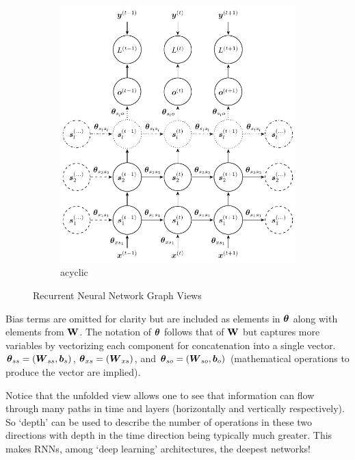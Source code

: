 \begin{figure}[H]
\begin{subfigure}[]{.79\textwidth}
    \begin{center}
    \includegraphics[]{figs/rnn_uf.pdf}
    \end{center}
    \caption{acyclic}
    \label{fig:rnn_uf}
  \end{subfigure}
  \caption{Recurrent Neural Network Graph Views}
  \label{fig:rnn}
\end{figure}
\noindent
%
Bias terms are omitted for clarity but are included as elements in $\boldsymbol{\theta}$ along with elements from $\mathbf{W}$.
%
The notation of $\boldsymbol{\theta}$ follows that of $\mathbf{W}$ but captures more variables by vectorizing each component for concatenation into a single vector.
%
$\boldsymbol{\theta}_{ss} = (\boldsymbol{W}_{ss},\boldsymbol{b}_s)$, $\boldsymbol{\theta}_{xs} = (\boldsymbol{W}_{xs})$, and $\boldsymbol{\theta}_{so} = (\boldsymbol{W}_{so},\boldsymbol{b}_o)$ (mathematical operations to produce the vector are implied).


Notice that the unfolded view allows one to see that information can flow through many paths in time and layers (horizontally and vertically respectively). So `depth' can be used to describe the number of operations in these two directions with depth in the time direction being typically much greater. This makes RNNs, among `deep learning' architectures, the deepest networks!


